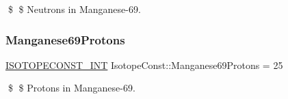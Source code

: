 \$ \$ Neutrons in Manganese-\/69. \mbox{\label{group___isotope_const-_manganese-_mn69_ga55797a6c95f25e5259a55961a69c1ad5}} 
\subsubsection{\texorpdfstring{Manganese69\+Protons}{Manganese69Protons}}
{\footnotesize\ttfamily \mbox{\hyperlink{group___isotope_const-_macros_ga5f18360b3e99483a35c32d789e62621c}{I\+S\+O\+T\+O\+P\+E\+C\+O\+N\+S\+T\+\_\+\+I\+NT}} Isotope\+Const\+::\+Manganese69\+Protons = 25}

\$ \$ Protons in Manganese-\/69. 